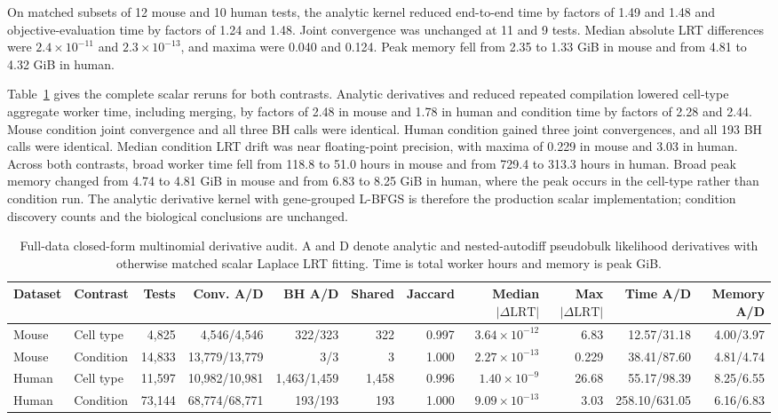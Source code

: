 \documentclass[11pt]{article}
\begin{document}
On matched subsets of 12 mouse and 10 human tests, the analytic kernel reduced end-to-end time by factors of 1.49 and 1.48 and objective-evaluation time by factors of 1.24 and 1.48. Joint convergence was unchanged at 11 and 9 tests. Median absolute LRT differences were $2.4\times10^{-11}$ and $2.3\times10^{-13}$, and maxima were 0.040 and 0.124. Peak memory fell from 2.35 to 1.33 GiB in mouse and from 4.81 to 4.32 GiB in human.

Table~\ref{tab:analytic-derivative-full} gives the complete scalar reruns for both contrasts. Analytic derivatives and reduced repeated compilation lowered cell-type aggregate worker time, including merging, by factors of 2.48 in mouse and 1.78 in human and condition time by factors of 2.28 and 2.44. Mouse condition joint convergence and all three BH calls were identical. Human condition gained three joint convergences, and all 193 BH calls were identical. Median condition LRT drift was near floating-point precision, with maxima of 0.229 in mouse and 3.03 in human. Across both contrasts, broad worker time fell from 118.8 to 51.0 hours in mouse and from 729.4 to 313.3 hours in human. Broad peak memory changed from 4.74 to 4.81 GiB in mouse and from 6.83 to 8.25 GiB in human, where the peak occurs in the cell-type rather than condition run. The analytic derivative kernel with gene-grouped L-BFGS is therefore the production scalar implementation; condition discovery counts and the biological conclusions are unchanged.

\begin{table}[H]
\centering
\tiny
\setlength{\tabcolsep}{2pt}
\caption{Full-data closed-form multinomial derivative audit. A and D denote analytic and nested-autodiff pseudobulk likelihood derivatives with otherwise matched scalar Laplace LRT fitting. Time is total worker hours and memory is peak GiB.}
\label{tab:analytic-derivative-full}
\begin{tabular}{llrrrrrrrrr}
\toprule
Dataset & Contrast & Tests & Conv. A/D & BH A/D & Shared & Jaccard & Median $|\Delta\mathrm{LRT}|$ & Max $|\Delta\mathrm{LRT}|$ & Time A/D & Memory A/D\\
\midrule
Mouse & Cell type & 4,825 & 4,546/4,546 & 322/323 & 322 & 0.997 & $3.64\times10^{-12}$ & 6.83 & 12.57/31.18 & 4.00/3.97\\
Mouse & Condition & 14,833 & 13,779/13,779 & 3/3 & 3 & 1.000 & $2.27\times10^{-13}$ & 0.229 & 38.41/87.60 & 4.81/4.74\\
Human & Cell type & 11,597 & 10,982/10,981 & 1,463/1,459 & 1,458 & 0.996 & $1.40\times10^{-9}$ & 26.68 & 55.17/98.39 & 8.25/6.55\\
Human & Condition & 73,144 & 68,774/68,771 & 193/193 & 193 & 1.000 & $9.09\times10^{-13}$ & 3.03 & 258.10/631.05 & 6.16/6.83\\
\bottomrule
\end{tabular}
\end{table}
\end{document}

